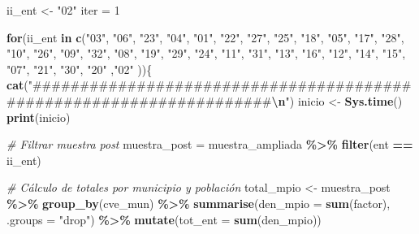 \documentclass[
  12pt,
]{book}
\newenvironment{Shaded}{\begin{snugshade}}{\end{snugshade}}
\newcommand{\AttributeTok}[1]{\textcolor[rgb]{0.13,0.29,0.53}{#1}}
\newcommand{\CommentTok}[1]{\textcolor[rgb]{0.56,0.35,0.01}{\textit{#1}}}
\newcommand{\ControlFlowTok}[1]{\textcolor[rgb]{0.13,0.29,0.53}{\textbf{#1}}}
\newcommand{\DecValTok}[1]{\textcolor[rgb]{0.00,0.00,0.81}{#1}}
\newcommand{\FunctionTok}[1]{\textcolor[rgb]{0.13,0.29,0.53}{\textbf{#1}}}
\newcommand{\NormalTok}[1]{#1}
\newcommand{\OtherTok}[1]{\textcolor[rgb]{0.56,0.35,0.01}{#1}}
\newcommand{\SpecialCharTok}[1]{\textcolor[rgb]{0.81,0.36,0.00}{\textbf{#1}}}
\newcommand{\StringTok}[1]{\textcolor[rgb]{0.31,0.60,0.02}{#1}}
\begin{document}
\begin{Shaded}
\begin{Highlighting}[]
\NormalTok{ii\_ent }\OtherTok{\textless{}{-}} \StringTok{"02"}
\NormalTok{iter }\OtherTok{=} \DecValTok{1}

\ControlFlowTok{for}\NormalTok{(ii\_ent }\ControlFlowTok{in} \FunctionTok{c}\NormalTok{(}\StringTok{"03"}\NormalTok{, }\StringTok{"06"}\NormalTok{, }\StringTok{"23"}\NormalTok{, }\StringTok{"04"}\NormalTok{, }\StringTok{"01"}\NormalTok{, }\StringTok{"22"}\NormalTok{, }\StringTok{"27"}\NormalTok{, }\StringTok{"25"}\NormalTok{, }\StringTok{"18"}\NormalTok{,}
                \StringTok{"05"}\NormalTok{, }\StringTok{"17"}\NormalTok{, }\StringTok{"28"}\NormalTok{, }\StringTok{"10"}\NormalTok{, }\StringTok{"26"}\NormalTok{, }\StringTok{"09"}\NormalTok{, }\StringTok{"32"}\NormalTok{, }\StringTok{"08"}\NormalTok{, }\StringTok{"19"}\NormalTok{, }\StringTok{"29"}\NormalTok{, }
                \StringTok{"24"}\NormalTok{, }\StringTok{"11"}\NormalTok{, }\StringTok{"31"}\NormalTok{, }\StringTok{"13"}\NormalTok{, }\StringTok{"16"}\NormalTok{, }\StringTok{"12"}\NormalTok{, }\StringTok{"14"}\NormalTok{, }\StringTok{"15"}\NormalTok{, }\StringTok{"07"}\NormalTok{, }\StringTok{"21"}\NormalTok{, }
                \StringTok{"30"}\NormalTok{,  }\StringTok{"20"}\NormalTok{ ,}\StringTok{"02"}
\NormalTok{))\{}
  \FunctionTok{cat}\NormalTok{(}\StringTok{"\#\#\#\#\#\#\#\#\#\#\#\#\#\#\#\#\#\#\#\#\#\#\#\#\#\#\#\#\#\#\#\#\#\#\#\#\#\#\#\#\#\#\#\#\#\#\#\#\#\#\#\#\#\#\#\#\#\#\#\#\#\#\#\#\#\#\#\#}\SpecialCharTok{\textbackslash{}n}\StringTok{"}\NormalTok{)}
\NormalTok{  inicio }\OtherTok{\textless{}{-}} \FunctionTok{Sys.time}\NormalTok{()}
  \FunctionTok{print}\NormalTok{(inicio)}

  \CommentTok{\# Filtrar muestra post}
\NormalTok{  muestra\_post }\OtherTok{=}\NormalTok{ muestra\_ampliada }\SpecialCharTok{\%\textgreater{}\%} \FunctionTok{filter}\NormalTok{(ent }\SpecialCharTok{==}\NormalTok{ ii\_ent)}

  \CommentTok{\# Cálculo de totales por municipio y población}
\NormalTok{  total\_mpio  }\OtherTok{\textless{}{-}}\NormalTok{ muestra\_post }\SpecialCharTok{\%\textgreater{}\%} \FunctionTok{group\_by}\NormalTok{(cve\_mun) }\SpecialCharTok{\%\textgreater{}\%} 
    \FunctionTok{summarise}\NormalTok{(}\AttributeTok{den\_mpio =} \FunctionTok{sum}\NormalTok{(factor), }\AttributeTok{.groups =} \StringTok{"drop"}\NormalTok{) }\SpecialCharTok{\%\textgreater{}\%} 
    \FunctionTok{mutate}\NormalTok{(}\AttributeTok{tot\_ent =} \FunctionTok{sum}\NormalTok{(den\_mpio))}


\end{Highlighting}
\end{Shaded}
\end{document}
